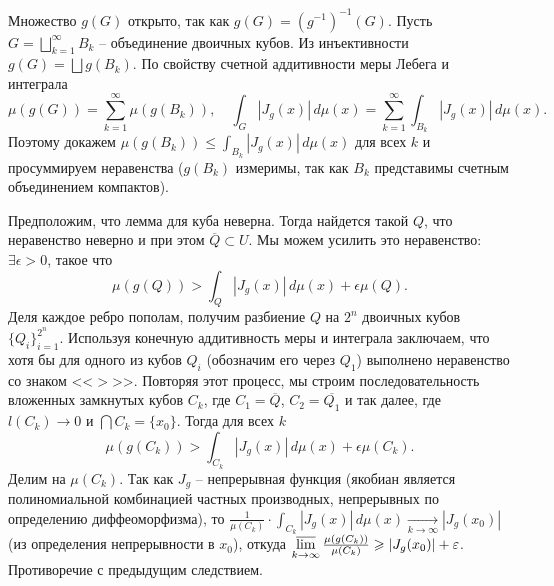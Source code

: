  \begin{myproof}
    Множество $g(G)$ открыто, так как $g(G) = (g^{-1})^{-1}(G)$. Пусть $G = \bigsqcup \limits_{k=1}^{\infty} B_k$ -- объединение двоичных кубов. 
	Из инъективности $g(G) = \bigsqcup g(B_k)$.
	По свойству счетной аддитивности меры Лебега и интеграла 
	\[ \mu(g(G)) = \sum_{k=1}^{\infty} \mu(g(B_k)), \quad  \int_G |J_g(x)| \, d\mu(x) = \sum_{k=1}^{\infty} \int_{B_k} |J_g(x)| \, d\mu(x). \]
	Поэтому докажем $\mu(g(B_k)) \le \int_{B_k} |J_g(x)| \, d\mu(x)$ для всех $k$ и просуммируем неравенства ($g(B_k)$ измеримы, так как $B_k$ представимы счетным объединением компактов).

    \vspace{5pt}
    Предположим, что лемма для куба неверна. Тогда найдется такой $Q$, что неравенство неверно и при этом $\overline{Q} \subset U$. Мы можем усилить это неравенство: $\exists \epsilon > 0$, такое что
    \[ \mu(g(Q)) > \int_{Q} |J_g(x)| \, d\mu(x) + \epsilon \mu(Q). \]
    Деля каждое ребро пополам, получим разбиение $Q$ на $2^n$ двоичных кубов $\{Q_i\}_{i=1}^{2^n}$. 
    Используя конечную аддитивность меры и интеграла заключаем, что хотя бы для одного из кубов $Q_i$ (обозначим его через $Q_1$) выполнено неравенство со знаком <<$>$>>. 
	Повторяя этот процесс, мы строим последовательность вложенных замкнутых кубов $C_k$, где $C_1 = \overline{Q}$, $C_2 = \overline{Q_1}$ и так далее, где $l(C_k) \to 0$ и $\bigcap C_k = \{x_0\}$.
    Тогда для всех $k$ 
    \[ \mu(g(C_k)) > \int_{C_k} |J_g(x)| \, d\mu(x) + \epsilon \mu(C_k). \]
    Делим на $\mu(C_k)$. Так как $J_g$ -- непрерывная функция (якобиан является полиномиальной комбинацией частных производных, непрерывных по определению диффеоморфизма), то $\frac{1}{\mu(C_k)} \cdot \int_{C_k} |J_g(x)| \, d\mu(x) \underset{k \to \infty}{\to} |J_g(x_0)|$ (из определения непрерывности в $x_0$), откуда $\varlimsup \limits_{k \to \infty} \frac{\mu(g(C_k))}{\mu(C_k)} \geq |J_g(x_0)| + \epsilon$.
    Противоречие с предыдущим следствием.
 \end{myproof}

